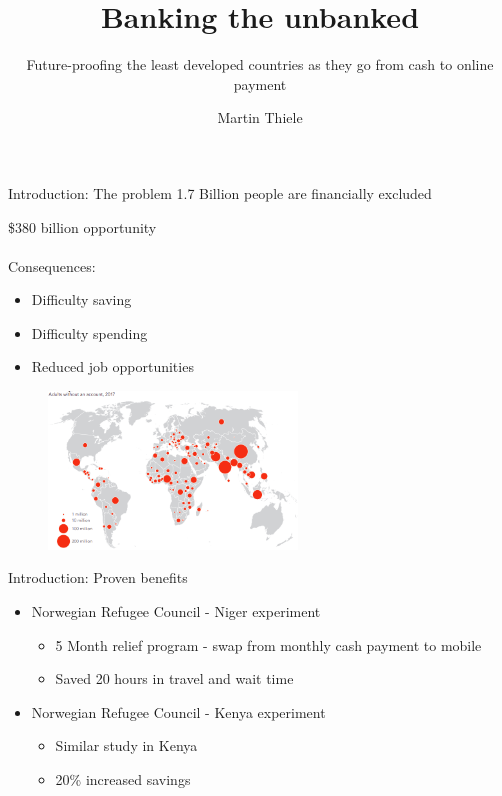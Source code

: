 \documentclass[10pt]{beamer}
\title{Banking the unbanked}
\subtitle{Future-proofing the least developed countries as they go from cash to online payment}
\author{Martin Thiele}
\institute[University of Copenhagen] %
{
    Master's Thesis\\June 17, 2021\\
    \bigskip \bigskip mqn507@alumni.ku.dk
}
\date{}
\begin{document}
\begin{frame}
  \titlepage
\end{frame}

\begin{frame}{Introduction: The problem}
    \vspace{.5cm}
    1.7 Billion people are financially excluded\\
    \begin{minipage}[t]{0.35\textwidth}
    \vspace{.2cm}
    \$380 billion opportunity\\\\
    Consequences:
        \begin{itemize}
            \item Difficulty saving
            \item Difficulty spending
            \item Reduced job opportunities
        \end{itemize}
    \end{minipage}
    \begin{minipage}[t]{0.60\textwidth}
        \begin{figure}
        \centering
        \includegraphics[height=4.2cm]{figs/unbanked_map.jpg}
        \vspace{1cm}
    \end{figure}
    \end{minipage}
\end{frame}

\begin{frame}{Introduction: Proven benefits}
    \begin{itemize}
        \item{Norwegian Refugee Council - Niger experiment}
        \begin{itemize}
            \item 5 Month relief program - swap from monthly cash payment to mobile
            \item Saved 20 hours in travel and wait time
        \end{itemize}
        \item{Norwegian Refugee Council - Kenya experiment}
        \begin{itemize}
            \item Similar study in Kenya
            \item 20\% increased savings
        \end{itemize}
    \end{itemize}
\end{frame}
\end{document}
